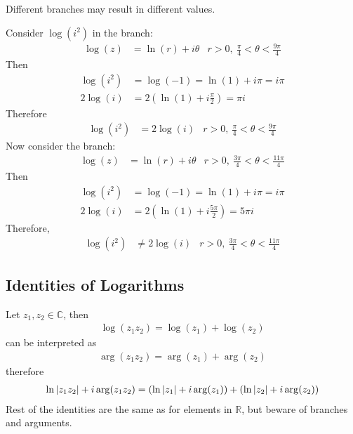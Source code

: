 \documentclass[12pt, english]{book}
\begin{document}
	Different branches may result in different values.
	\begin{example}
		Consider \(\log(i^2)\) in the branch: 
		\begin{align*}
			\log(z) &= \ln(r) + i\theta & r>0, \ \frac{\pi}{4}<\theta<\frac{9\pi}{4}
		\end{align*}
		Then
		\begin{align*}
			\log(i^2) &= \log(-1) = \ln(1) + i\pi = i\pi \\
			2\log(i) &= 2\left(\ln(1) + i\frac{\pi}{2}\right) = \pi i
		\end{align*}
		Therefore
		\begin{align*}
			\log(i^2) &= 2\log(i) & r>0, \ \frac{\pi}{4}<\theta<\frac{9\pi}{4}
		\end{align*}
		Now consider the branch:
		\begin{align*}
			\log(z) &= \ln(r) + i\theta & r>0, \ \frac{3\pi}{4}<\theta<\frac{11\pi}{4}
		\end{align*}
		{\color{Grey}
		Then 
		\begin{align*}
			\log(i^2) &= \log(-1) = \ln(1) + i\pi = i\pi\\
			2\log(i) &= 2\left(\ln(1) + i\frac{5\pi}{2}\right) = 5\pi i
		\end{align*}
		Therefore,
		\begin{align*}
			\log(i^2) &\neq 2\log(i) & r>0, \ \frac{3\pi}{4}<\theta<\frac{11\pi}{4}
		\end{align*}
		}
	\end{example}

	\subsection{Identities of Logarithms} \label{Identities of Logarithms Subsection - Complex}
	
	Let \(z_1, z_2 \in \mathbb{C}\), then 
	\begin{align*}
		\log(z_1 z_2) = \log(z_1) + \log(z_2)
	\end{align*}
	can be interpreted as 
	\begin{align*}
		\arg(z_1 z_2) = \arg(z_1) + \arg(z_2)
	\end{align*}
	therefore
	\begin{align*}
		\ln\abs{z_1 z_2} + i\arg(z_1 z_2) = (\ln\abs{z_1} + i\arg(z_1)) + (\ln\abs{z_2} + i\arg(z_2))
	\end{align*}
	Rest of the identities are the same as for elements in \(\mathbb{R}\), but beware of branches and arguments.
	
\end{document}
